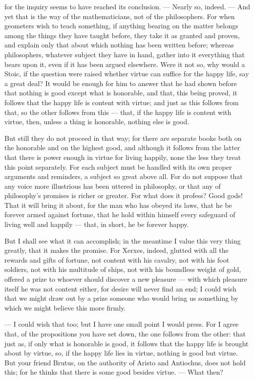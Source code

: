  for the inquiry seems to have reached its conclusion. — Nearly so, indeed. — And yet that is the way of the mathematicians, not of the philosophers. For when geometers wish to teach something, if anything bearing on the matter belongs among the things they have taught before, they take it as granted and proven, and explain only that about which nothing has been written before; whereas philosophers, whatever subject they have in hand, gather into it everything that bears upon it, even if it has been argued elsewhere. Were it not so, why would a Stoic, if the question were raised whether virtue can suffice for the happy life, say a great deal? It would be enough for him to answer that he had shown before that nothing is good except what is honorable, and that, this being proved, it follows that the happy life is content with virtue; and just as this follows from that, so the other follows from this — that, if the happy life is content with virtue, then, unless a thing is honorable, nothing else is good.

 But still they do not proceed in that way; for there are separate books both on the honorable and on the highest good, and although it follows from the latter that there is power enough in virtue for living happily, none the less they treat this point separately. For each subject must be handled with its own proper arguments and reminders, a subject so great above all. For do not suppose that any voice more illustrious has been uttered in philosophy, or that any of philosophy's promises is richer or greater. For what does it profess? Good gods! That it will bring it about, for the man who has obeyed its laws, that he be forever armed against fortune, that he hold within himself every safeguard of living well and happily — that, in short, he be forever happy.

 But I shall see what it can accomplish; in the meantime I value this very thing greatly, that it makes the promise. For Xerxes, indeed, glutted with all the rewards and gifts of fortune, not content with his cavalry, not with his foot soldiers, not with his multitude of ships, not with his boundless weight of gold, offered a prize to whoever should discover a new pleasure — with which pleasure itself he was not content either, for desire will never find an end; I could wish that we might draw out by a prize someone who would bring us something by which we might believe this more firmly.

 — I could wish that too; but I have one small point I would press. For I agree that, of the propositions you have set down, the one follows from the other: that just as, if only what is honorable is good, it follows that the happy life is brought about by virtue, so, if the happy life lies in virtue, nothing is good but virtue. But your friend Brutus, on the authority of Aristo and Antiochus, does not hold this; for he thinks that there is some good besides virtue. — What then?

